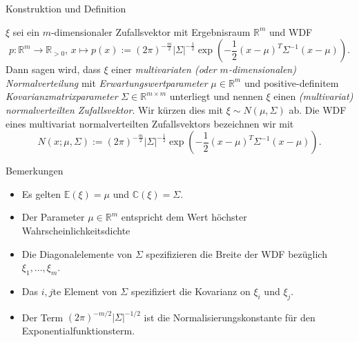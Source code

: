 \documentclass[
  8pt,
  ignorenonframetext,
]{beamer}
\providecommand{\tightlist}{%
  \setlength{\itemsep}{0pt}\setlength{\parskip}{0pt}}
\begin{document}
\begin{frame}{Konstruktion und Definition}
\protect\hypertarget{konstruktion-und-definition-5}{}
\footnotesize
\begin{definition}
\justifying
$\xi$ sei ein $m$-dimensionaler Zufallsvektor mit Ergebnisraum $\mathbb{R}^m$ und WDF
\begin{equation}
p : \mathbb{R}^m \to \mathbb{R}_{>0},\, x \mapsto p(x)
:= (2\pi)^{-\frac{m}{2}}|\Sigma|^{-\frac{1}{2}}\exp\left(-\frac{1}{2}(x-\mu)^T \Sigma^{-1} (x-\mu)\right).
\end{equation}
Dann sagen wird, dass $\xi$ einer \textit{multivariaten (oder $m$-dimensionalen)
Normalverteilung} mit \textit{Erwartungswertparameter} $\mu \in \mathbb{R}^m$ und
positive-definitem \textit{Kovarianzmatrixparameter} $\Sigma \in \mathbb{R}^{m \times m}$
unterliegt und nennen $\xi$ einen \textit{(multivariat) normalverteilten Zufallsvektor}.
Wir kürzen dies mit $\xi \sim N(\mu,\Sigma)$ ab. Die WDF eines multivariat
normalverteilten Zufallsvektors bezeichnen wir mit
\begin{equation}
N(x;\mu,\Sigma):= (2\pi)^{-\frac{m}{2}}|\Sigma|^{-\frac{1}{2}}\exp\left(-\frac{1}{2}(x-\mu)^T \Sigma^{-1} (x-\mu)\right).
\end{equation}
\end{definition}

Bemerkungen

\begin{itemize}
\tightlist
\item
  Es gelten \(\mathbb{E}(\xi) = \mu\) und \(\mathbb{C}(\xi) = \Sigma\).
\item
  Der Parameter \(\mu \in \mathbb{R}^m\) entspricht dem Wert höchster
  Wahrscheinlichkeitsdichte
\item
  Die Diagonalelemente von \(\Sigma\) spezifizieren die Breite der WDF
  bezüglich \(\xi_1,...,\xi_m\).
\item
  Das \(i,j\)te Element von \(\Sigma\) spezifiziert die Kovarianz on
  \(\xi_i\) und \(\xi_j\).
\item
  Der Term \((2\pi)^{-m/2}|\Sigma|^{-1/2}\) ist die
  Normalisierungskonstante für den Exponentialfunktionsterm.
\end{itemize}
\end{frame}
\end{document}
